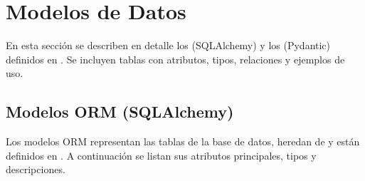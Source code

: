 \documentclass[a4paper,11pt,spanish]{sphinxmanual}
\begin{document}
\sphinxstepscope


\chapter{Modelos de Datos}
\label{\detokenize{modelos:modelos-de-datos}}\label{\detokenize{modelos::doc}}
\sphinxAtStartPar
En esta sección se describen en detalle los  (SQLAlchemy) y los  (Pydantic) definidos en . Se incluyen tablas con atributos, tipos, relaciones y ejemplos de uso.


\section{Modelos ORM (SQLAlchemy)}
\label{\detokenize{modelos:modelos-orm-sqlalchemy}}
\sphinxAtStartPar
Los modelos ORM representan las tablas de la base de datos, heredan de  y están definidos en . A continuación se listan sus atributos principales, tipos y descripciones.
\end{document}
